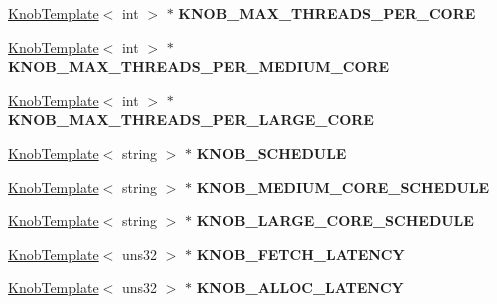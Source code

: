 \begin{DoxyCompactItemize}
\item 
\hypertarget{classall__knobs__c_a6996c338acb7e515e5b118a5b595052b}{
\hyperlink{classKnobTemplate}{KnobTemplate}$<$ int $>$ $\ast$ {\bfseries KNOB\_\-MAX\_\-THREADS\_\-PER\_\-CORE}}
\label{classall__knobs__c_a6996c338acb7e515e5b118a5b595052b}

\item 
\hypertarget{classall__knobs__c_ad8bcb2b478968f68db41a4b2bbd75b03}{
\hyperlink{classKnobTemplate}{KnobTemplate}$<$ int $>$ $\ast$ {\bfseries KNOB\_\-MAX\_\-THREADS\_\-PER\_\-MEDIUM\_\-CORE}}
\label{classall__knobs__c_ad8bcb2b478968f68db41a4b2bbd75b03}

\item 
\hypertarget{classall__knobs__c_a1ba7e5350d7fac6acbacf0d81dfdad30}{
\hyperlink{classKnobTemplate}{KnobTemplate}$<$ int $>$ $\ast$ {\bfseries KNOB\_\-MAX\_\-THREADS\_\-PER\_\-LARGE\_\-CORE}}
\label{classall__knobs__c_a1ba7e5350d7fac6acbacf0d81dfdad30}

\item 
\hypertarget{classall__knobs__c_a73f27be1e4e2a2a14a2699d0429b3652}{
\hyperlink{classKnobTemplate}{KnobTemplate}$<$ string $>$ $\ast$ {\bfseries KNOB\_\-SCHEDULE}}
\label{classall__knobs__c_a73f27be1e4e2a2a14a2699d0429b3652}

\item 
\hypertarget{classall__knobs__c_aa9790c99eb4fc023a8165b9d88f3e554}{
\hyperlink{classKnobTemplate}{KnobTemplate}$<$ string $>$ $\ast$ {\bfseries KNOB\_\-MEDIUM\_\-CORE\_\-SCHEDULE}}
\label{classall__knobs__c_aa9790c99eb4fc023a8165b9d88f3e554}

\item 
\hypertarget{classall__knobs__c_a6fed20719605d044aa969f62e07771a9}{
\hyperlink{classKnobTemplate}{KnobTemplate}$<$ string $>$ $\ast$ {\bfseries KNOB\_\-LARGE\_\-CORE\_\-SCHEDULE}}
\label{classall__knobs__c_a6fed20719605d044aa969f62e07771a9}

\item 
\hypertarget{classall__knobs__c_a45797b033ee995c8cada75c1fa4679eb}{
\hyperlink{classKnobTemplate}{KnobTemplate}$<$ uns32 $>$ $\ast$ {\bfseries KNOB\_\-FETCH\_\-LATENCY}}
\label{classall__knobs__c_a45797b033ee995c8cada75c1fa4679eb}

\item 
\hypertarget{classall__knobs__c_a7e1c4010d12717ea250548055ed79224}{
\hyperlink{classKnobTemplate}{KnobTemplate}$<$ uns32 $>$ $\ast$ {\bfseries KNOB\_\-ALLOC\_\-LATENCY}}
\label{classall__knobs__c_a7e1c4010d12717ea250548055ed79224}


\end{DoxyCompactItemize}
